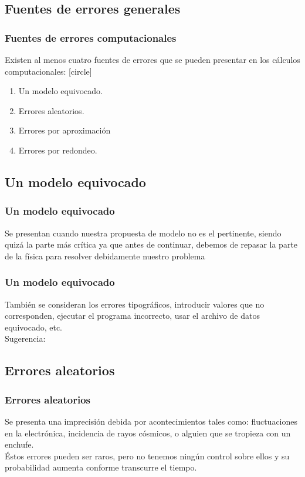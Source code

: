 \subsection{Fuentes de errores generales}
\begin{frame}
\frametitle{Fuentes de errores computacionales}
Existen al menos cuatro fuentes de errores que se pueden presentar en los cálculos computacionales:
\pause
{}
[circle]
\begin{enumerate}[<+->]
\item Un modelo equivocado.
\item Errores aleatorios.
\item Errores por aproximación
\item Errores por redondeo.
\end{enumerate}
\end{frame}
\subsection{Un modelo equivocado}
\begin{frame}
\frametitle{Un modelo equivocado}
Se presentan cuando nuestra propuesta de modelo no es el pertinente, siendo quizá la parte más crítica ya que antes de continuar, debemos de repasar la parte de la física para resolver debidamente nuestro problema
\end{frame}
\begin{frame}
\frametitle{Un modelo equivocado}
También se consideran los errores tipográficos, introducir valores que no corresponden, ejecutar el programa incorrecto, usar el archivo de datos equivocado, etc.
\\
\bigskip
Sugerencia: \pause {}
\end{frame}
\subsection{Errores aleatorios}
\begin{frame}
\frametitle{Errores aleatorios}
Se presenta una imprecisión debida por acontecimientos tales como: fluctuaciones en la electrónica, incidencia de rayos cósmicos, o alguien que se tropieza con un enchufe.
\\
\bigskip
Éstos errores pueden ser raros, pero no tenemos ningún control sobre ellos y su probabilidad aumenta conforme transcurre el tiempo.
\end{frame}
